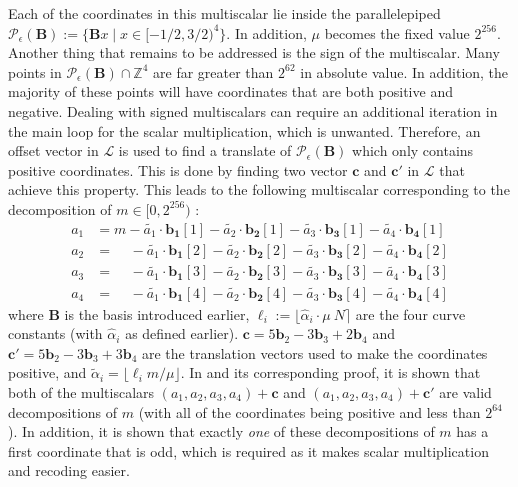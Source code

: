 Each of the coordinates in this multiscalar lie inside the parallelepiped $\mathcal{P}_\epsilon (\bm{B}) := \{ \bm{B}x \mid x \in [-1/2, 3/2)^4\}$.
In addition, $\mu$ becomes the fixed value $2^{256}$.
Another thing that remains to be addressed is the sign of the multiscalar.
Many points in $\mathcal{P}_\epsilon (\bm{B}) \cap \mathbb{Z}^4 $ are far greater than $2^{62}$ in absolute value. 
In addition, the majority of these points will have coordinates that are both positive and negative.
Dealing with signed multiscalars can require an additional iteration in the main loop for the scalar multiplication, which is unwanted.
Therefore, an offset vector in $\mathcal{L}$ is used to find a translate of $\mathcal{P}_\epsilon (\bm{B})$  which only contains positive coordinates.
This is done by finding two vector $\bm{c}$ and $\bm{c}'$ in $\mathcal{L}$ that achieve this property.
This leads to the following multiscalar corresponding to the decomposition of $m \in [0, 2^{256})$ \cite{costello2015fourq}:
%
\begin{align*}
a_1 &= m - \tilde{a_1}    \cdot \bm{b_1}[1] - \tilde{a_2} \cdot \bm{b_2}[1] - \tilde{a_3} \cdot \bm{b_3}[1] - \tilde{a_4} \cdot \bm{b_4}[1] \\
a_2 &=~~~~~ - \tilde{a_1} \cdot \bm{b_1}[2] - \tilde{a_2} \cdot \bm{b_2}[2] - \tilde{a_3} \cdot \bm{b_3}[2] - \tilde{a_4} \cdot \bm{b_4}[2] \\
a_3 &=~~~~~ - \tilde{a_1} \cdot \bm{b_1}[3] - \tilde{a_2} \cdot \bm{b_2}[3] - \tilde{a_3} \cdot \bm{b_3}[3] - \tilde{a_4} \cdot \bm{b_4}[3] \\
a_4 &=~~~~~ - \tilde{a_1} \cdot \bm{b_1}[4] - \tilde{a_2} \cdot \bm{b_2}[4] - \tilde{a_3} \cdot \bm{b_3}[4] - \tilde{a_4} \cdot \bm{b_4}[4]
\end{align*}
%
where $\bm{B}$ is the basis introduced earlier, $\ell_i := \lfloor \hat{\alpha}_i \cdot \mu \ N \rceil$ are the four curve constants (with $\hat{\alpha}_i$ as defined earlier).
$\bm{c} = 5\bm{b}_2 - 3\bm{b}_3 + 2\bm{b}_4$ and $\bm{c'} = 5\bm{b}_2 - 3\bm{b}_3 + 3\bm{b}_4$ are the translation vectors used to make the coordinates positive, and $\tilde{\alpha}_i = \lfloor \ell_i m / \mu \rfloor$. In \cite[§4.3, Proposition 5]{costello2015fourq} and its corresponding proof, it is shown that both of the multiscalars $(a_1, a_2, a_3, a_4) + \bm{c}$ and $(a_1, a_2, a_3, a_4) + \bm{c'}$ are valid decompositions of $m$ (with all of the coordinates being positive and less than $2^{64}$). 
In addition, it is shown that exactly \emph{one} of these decompositions of $m$ has a first coordinate that is odd, which is required as it makes scalar multiplication and recoding easier.